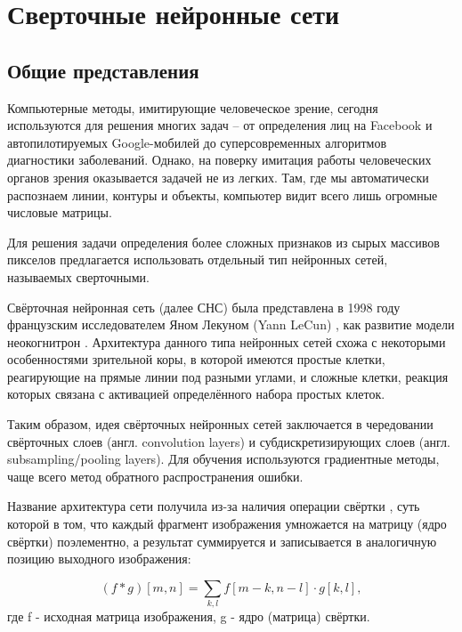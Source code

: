 \documentclass[14pt]{article}
\numberwithin{figure}{section}
\numberwithin{equation}{section}
\begin{document}
\newpage

\section{Сверточные нейронные сети}

\subsection{Общие представления}

Компьютерные методы, имитирующие человеческое зрение, сегодня используются для решения многих задач – от определения лиц на Facebook и автопилотируемых Google-мобилей до суперсовременных алгоритмов диагностики заболеваний. Однако, на поверку имитация работы человеческих органов зрения оказывается задачей не из легких. Там, где мы автоматически распознаем линии, контуры и объекты, компьютер видит всего лишь огромные числовые матрицы.

Для решения задачи определения более сложных признаков из сырых массивов пикселов предлагается использовать отдельный тип нейронных сетей, называемых сверточными.

Свёрточная нейронная сеть (далее СНС) была представлена в 1998 году французским исследователем Яном Лекуном (Yann LeCun) \cite{LeCun}, как развитие модели неокогнитрон \cite{Fukushima}. Архитектура данного типа нейронных сетей схожа с некоторыми особенностями зрительной коры, в которой имеются простые клетки, реагирующие на прямые линии под разными углами, и сложные клетки, реакция которых связана с активацией определённого набора простых клеток.

Таким образом, идея свёрточных нейронных сетей заключается в чередовании свёрточных слоев (англ. convolution layers) и субдискретизирующих слоев (англ. subsampling/pooling layers). Для обучения используются градиентные методы, чаще всего метод обратного распространения ошибки.

Название архитектура сети получила из-за наличия операции свёртки \cite{Borisov1}, суть которой в том, что каждый фрагмент изображения умножается на матрицу (ядро свёртки) поэлементно, а результат суммируется и записывается в аналогичную позицию выходного изображения:

\begin{equation}\label{eq3}
	(f * g)[m, n] = \sum_{k,l}{f[m - k, n - l] \cdot g[k, l]},
\end{equation}
где f - исходная матрица изображения, g - ядро (матрица) свёртки.
\end{document}

